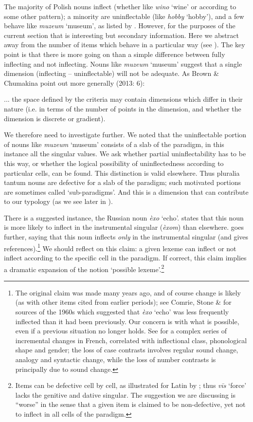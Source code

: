 \documentclass[output=paper]{langscibook}
\begin{document}
The majority of Polish nouns inflect (whether like \textit{wino} ‘wine’ or according to some other pattern); a minority are uninflectable (like \textit{hobby} ‘hobby’), and a few behave like \textit{muzeum} ‘museum’, as listed by \citet[118]{Swan2002}. However, for the purposes of the current section that is interesting but secondary information. Here we abstract away from the number of items which behave in a particular way (see ). The key point is that there is more going on than a simple difference between fully inflecting and not inflecting. Nouns like \textit{muzeum} ‘museum’ suggest that a single dimension (inflecting – uninflectable) will not be adequate. As Brown \& Chumakina point out more generally (2013: 6):

... the space defined by the criteria may contain dimensions which differ in their nature (i.e. in terms of the number of points in the dimension, and whether the dimension is discrete or gradient).

We therefore need to investigate further. We noted that the uninflectable portion of nouns like \textit{muzeum} ‘museum’ consists of a slab of the paradigm, in this instance all the singular values. We ask whether partial uninflectability has to be this way, or whether the logical possibility of uninflectedness according to particular cells, can be found. This distinction is valid elsewhere. Thus pluralia tantum nouns are defective for a slab of the paradigm; such motivated portions are sometimes called ‘sub-paradigms’. And this is a dimension that can contribute to our typology (as we see later in ).

There is a suggested instance, the Russian noun \textit{èxo} ‘echo’. \citet[133-134]{Unbegaun1947} states that this noun is more likely to inflect in the instrumental singular (\textit{èxom}) than elsewhere. \citet[182-183]{Thomas1983} goes further, saying that this noun inflects \textit{only} in the instrumental singular (and gives references).\footnote{The original claim was made many years ago, and of course change is likely (as with other items cited from earlier periods); see Comrie, Stone \& \citet[120]{Polinsky1996} for sources of the 1960s which suggested that \textit{èxo} ‘echo’ was less frequently inflected than it had been previously. Our concern is with what is possible, even if a previous situation no longer holds. See \citet{Esher2025} for a complex series of incremental changes in French, correlated with inflectional class, phonological shape and gender; the loss of case contrasts involves regular sound change, analogy and syntactic change, while the loss of number contrasts is principally due to sound change.} We should reflect on this claim: a given lexeme can inflect or not inflect according to the specific cell in the paradigm. If correct, this claim implies a dramatic expansion of the notion ‘possible lexeme’.\footnote{ \textrm{Items can be defective cell by cell, as illustrated for Latin by \citet[229]{Rhodes1987}; thus} \textrm{\textit{vīs}} \textrm{‘force’ lacks the genitive and dative singular. The suggestion we are discussing is “worse” in the sense that a given item is claimed to be non-defective, yet not to inflect in all cells of the paradigm.}} 
\end{document}
